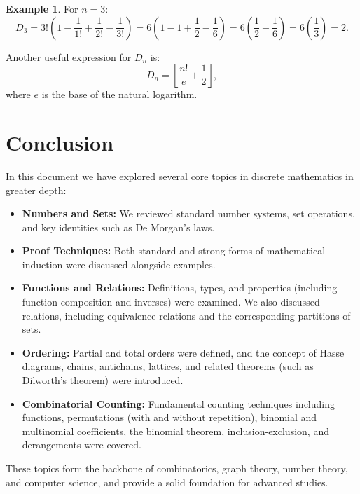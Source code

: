\documentclass[12pt]{article}
\theoremstyle{definition}
\newtheorem{example}[theorem]{Example}
\begin{document}
\begin{example}
  For \(n=3\):
  \[
  D_3 = 3! \left(1 - \frac{1}{1!} + \frac{1}{2!} - \frac{1}{3!}\right)
  = 6\left(1 - 1 + \frac{1}{2} - \frac{1}{6}\right)
  = 6\left(\frac{1}{2} - \frac{1}{6}\right)
  = 6\left(\frac{1}{3}\right)
  = 2.
  \]
\end{example}

Another useful expression for \(D_n\) is:
\[
D_n = \left\lfloor \frac{n!}{e} + \frac{1}{2} \right\rfloor,
\]
where \(e\) is the base of the natural logarithm.

\section*{Conclusion}

In this document we have explored several core topics in discrete mathematics in greater depth:
\begin{itemize}
  \item \textbf{Numbers and Sets:} We reviewed standard number systems, set operations, and key identities such as De Morgan's laws.
  \item \textbf{Proof Techniques:} Both standard and strong forms of mathematical induction were discussed alongside examples.
  \item \textbf{Functions and Relations:} Definitions, types, and properties (including function composition and inverses) were examined. We also discussed relations, including equivalence relations and the corresponding partitions of sets.
  \item \textbf{Ordering:} Partial and total orders were defined, and the concept of Hasse diagrams, chains, antichains, lattices, and related theorems (such as Dilworth's theorem) were introduced.
  \item \textbf{Combinatorial Counting:} Fundamental counting techniques including functions, permutations (with and without repetition), binomial and multinomial coefficients, the binomial theorem, inclusion-exclusion, and derangements were covered.
\end{itemize}

These topics form the backbone of combinatorics, graph theory, number theory, and computer science, and provide a solid foundation for advanced studies.
\end{document}
